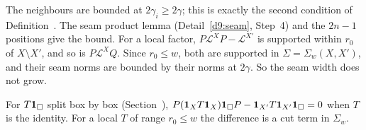 \begin{detail}
\begin{step}[Differences]
\begin{itemize}
\end{itemize}
The neighbours are bounded at $2\gamma_i\ge2\gamma$; this is exactly the second condition of Definition~. The seam product lemma (Detail~\ref{d9:seam}, Step~4) and the $2n-1$ positions give the bound. For a local factor, $P\mathcal L^XP-\mathcal L^{X'}$ is supported within $r_0$ of $X\setminus X'$, and so is $P\mathcal L^XQ$. Since $r_0\le w$, both are supported in $\Sigma=\Sigma_w(X,X')$, and their seam norms are bounded by their norms at $2\gamma$. So the seam width does not grow.
\end{step}
\begin{step}
For $T\mathbf 1_\Box$ split box by box (Section~), $P(\mathbf 1_XT\mathbf 1_X)\mathbf 1_\Box P-\mathbf 1_{X'}T\mathbf 1_{X'}\mathbf 1_\Box=0$ when $T$ is the identity. For a local $T$ of range $r_0\le w$ the difference is a cut term in $\Sigma_w$.
\end{step}
\end{detail}


